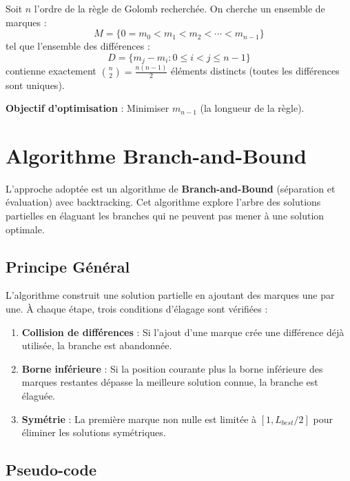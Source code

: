 \documentclass[12pt,a4paper,twoside]{report}
\begin{document}
Soit $n$ l'ordre de la règle de Golomb recherchée. On cherche un ensemble de marques :
\[
M = \{0 = m_0 < m_1 < m_2 < \cdots < m_{n-1}\}
\]
tel que l'ensemble des différences :
\[
D = \{m_j - m_i : 0 \leq i < j \leq n-1\}
\]
contienne exactement $\binom{n}{2} = \frac{n(n-1)}{2}$ éléments distincts (toutes les différences sont uniques).

\textbf{Objectif d'optimisation} : Minimiser $m_{n-1}$ (la longueur de la règle).

\section{Algorithme Branch-and-Bound}

L'approche adoptée est un algorithme de \textbf{Branch-and-Bound} (séparation et évaluation) avec backtracking. Cet algorithme explore l'arbre des solutions partielles en élaguant les branches qui ne peuvent pas mener à une solution optimale.

\subsection{Principe Général}

L'algorithme construit une solution partielle en ajoutant des marques une par une. À chaque étape, trois conditions d'élagage sont vérifiées :

\begin{enumerate}
    \item \textbf{Collision de différences} : Si l'ajout d'une marque crée une différence déjà utilisée, la branche est abandonnée.

    \item \textbf{Borne inférieure} : Si la position courante plus la borne inférieure des marques restantes dépasse la meilleure solution connue, la branche est élaguée.

    \item \textbf{Symétrie} : La première marque non nulle est limitée à $[1, L_{best}/2]$ pour éliminer les solutions symétriques.
\end{enumerate}

\subsection{Pseudo-code}
\end{document}
